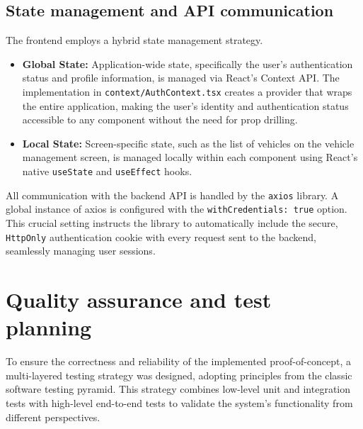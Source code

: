 \subsection{State management and API communication}
The frontend employs a hybrid state management strategy.
\begin{itemize}
    \item \textbf{Global State:} Application-wide state, specifically the user's authentication status and profile information, is managed via React's Context API. The implementation in \texttt{context/AuthContext.tsx} creates a provider that wraps the entire application, making the user's identity and authentication status accessible to any component without the need for prop drilling.
    \item \textbf{Local State:} Screen-specific state, such as the list of vehicles on the vehicle management screen, is managed locally within each component using React's native \texttt{useState} and \texttt{useEffect} hooks.
\end{itemize}
All communication with the backend API is handled by the \texttt{axios} library. A global instance of axios is configured with the \texttt{withCredentials: true} option. This crucial setting instructs the library to automatically include the secure, \texttt{HttpOnly} authentication cookie with every request sent to the backend, seamlessly managing user sessions.

\section{Quality assurance and test planning}
To ensure the correctness and reliability of the implemented proof-of-concept, a multi-layered testing strategy was designed, adopting principles from the classic software testing pyramid. This strategy combines low-level unit and integration tests with high-level end-to-end tests to validate the system's functionality from different perspectives.

